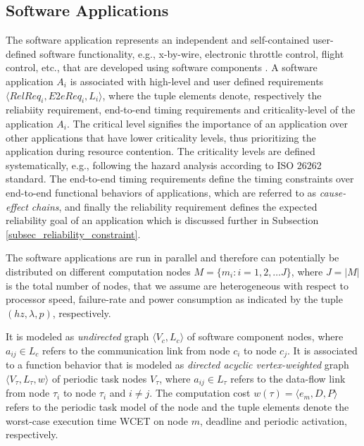 \subsection{Software Applications}
The software application represents an independent and self-contained user-defined software functionality, e.g., x-by-wire, electronic throttle control, flight control, etc., that are developed using software components \cite{softwarecomponents}\cite{Crnkovic2002BuildingSystems}. A software application $A_i$ is associated with high-level and user defined requirements $\langle RelReq_i, E2eReq_i,L_i\rangle$, where the tuple elements denote, respectively the reliabiity requirement, end-to-end timing requirements and criticality-level of the application $A_i$. The critical level signifies the importance of an application over other applications that have lower criticality levels, thus prioritizing the application during resource contention. The criticality levels are defined systematically, e.g., following the hazard analysis according to ISO 26262 standard. The end-to-end timing requirements define the timing constraints over end-to-end functional behaviors of applications, which are referred to as \textit{cause-effect chains}, and finally the reliability requirement defines the expected reliability goal of an application which is discussed further in Subsection \ref{subsec_reliability_constraint}. 

The software applications are run in parallel and therefore can potentially be distributed on different computation nodes $M =\{m_i:i=1,2,\dots J\}$, where $J=|M|$ is the total number of nodes, that we assume are heterogeneous with respect to processor speed, failure-rate and power consumption as indicated by the tuple $(hz, \lambda, p)$, respectively. 

\begin{definition}
It is modeled as \textit{undirected} graph $\langle V_c,L_c\rangle$ of software component nodes, where $a_{ij}\in L_c$ refers to the communication link from node $c_i$ to node $c_j$. It is associated to a function behavior that is modeled as \textit{directed acyclic vertex-weighted} graph $\langle V_\tau,L_\tau, w\rangle$ of periodic task nodes $V_\tau$, where $a_{ij}\in L_\tau$ refers to the data-flow link from node $\tau_i$ to node $\tau_i$ and $i \neq j$. The computation cost $w(\tau)=\langle e_m,D,P\rangle$ refers to the periodic task model of the node and the tuple elements denote the worst-case execution time {WCET} on node $m$, deadline and periodic activation, respectively.
\end{definition}

